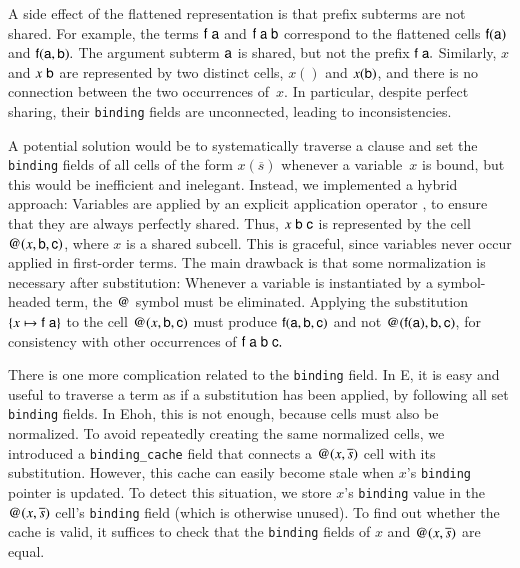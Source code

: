
A side effect of the flattened representation is that prefix subterms are not
shared. For example, the terms $\mathsf{f}\;\mathsf{a}$ and $\mathsf{f}\;\mathsf{a}\;\mathsf{b}$
correspond to the flattened cells $\mathsf{f}(\mathsf{a})$ and
$\mathsf{f}(\mathsf{a}, \mathsf{b}).$ The argument subterm $\mathsf{a}$ is shared, but not
the prefix $\mathsf{f}\;\mathsf{a}.$ Similarly,
$x$ and $x\;\mathsf{b}$ are represented by two distinct cells, $x()$ and
$x(\mathsf{b})$, and there is no connection between the two occurrences of~$x$.
%
In particular,
despite perfect sharing, their \verb|binding| fields are unconnected, leading
to inconsistencies.

A potential solution would be to systematically traverse a
clause and set the \verb|binding| fields of all cells of the form $x(\overline{s})$
whenever a variable~$x$ is bound, but this would be inefficient and inelegant.
Instead, we implemented a hybrid approach: Variables are applied by an
explicit application operator
\appvar{}, to ensure that they are always perfectly shared. Thus, $x\;\mathsf{b}\;\mathsf{c}$
is represented by the cell $\mathsf{@}(x, \mathsf{b}, \mathsf{c})$, where $x$ is a shared
subcell. This is graceful, since variables never occur applied in first-order
terms.
%
The main drawback is that some normalization is necessary
after substitution: Whenever a variable is instantiated by a symbol-headed term,
the $\mathsf{@}$ symbol must be eliminated.
Applying the substitution $\{x \mapsto \mathsf{f} \; \mathsf{a}\}$ to the cell
$\mathsf{@}(x, \mathsf{b}, \mathsf{c})$ must produce $\mathsf{f}(\mathsf{a}, \mathsf{b}, \mathsf{c})$ and
not $\mathsf{@}(\mathsf{f}(\mathsf{a}), \mathsf{b}, \mathsf{c})$, for consistency with other
occurrences of $\mathsf{f} \; \mathsf{a} \; \mathsf{b} \; \mathsf{c}.$

There is one more complication related to the \verb|binding| field. In E, it
is easy and useful to traverse a term as if a substitution has been applied,
by following all set \verb|binding| fields. In Ehoh, this is not enough,
because cells must also be normalized. To avoid repeatedly creating the
same normalized cells, we introduced a \verb|binding_cache| field
that connects a $\mathsf{@}(x, \overline{s})$ cell with its substitution.
%
However, this cache can easily become stale when $x$'s \verb|binding| pointer is
updated. To detect this situation, we store $x$'s \verb|binding|
value in the $\mathsf{@}(x, \overline{s})$ cell's \verb|binding|
field (which is otherwise unused).
To find out whether the cache is valid, it suffices to check that the
\verb|binding| fields of $x$ and $\mathsf{@}(x, \overline{s})$ are equal.

